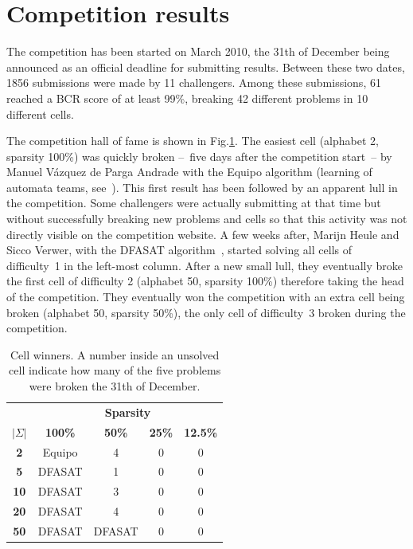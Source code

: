 
\section{Competition results\label{section:stamina-results}}

The competition has been started on March 2010, the 31th of December being announced as an official deadline for submitting results. Between these two dates, 1856 submissions were made by 11 challengers. Among these submissions, 61 reached a BCR score of at least 99\%, breaking 42 different problems in 10 different cells.

The competition hall of fame is shown in Fig.\ref{stamina:table:hall-of-fame}. The easiest cell (alphabet 2, sparsity 100\%) was quickly broken --~five days after the competition start~-- by Manuel V\'azquez de Parga Andrade with the Equipo algorithm (learning of automata teams, see~\cite{Garcia:2010}). This first result has been followed by an apparent lull in the competition. Some challengers were actually submitting at that time but without successfully breaking new problems and cells so that this activity was not directly visible on the competition website. A few weeks after, Marijn Heule and Sicco Verwer, with the DFASAT algorithm~\cite{Heule:2010}, started solving all cells of difficulty~1 in the left-most column. After a new small lull, they eventually broke the first cell of difficulty 2 (alphabet 50, sparsity 100\%) therefore taking the head of the competition. They eventually won the competition with an extra cell being broken (alphabet 50, sparsity 50\%), the only cell of difficulty~3 broken during the competition.

\begin{table}[H]
\begin{center}
\begin{tabular}{c|c c c c}
&\multicolumn{4}{|c}{\textbf{Sparsity}}\\ 
\textbf{$|\Sigma|$} & \textbf{100\%} & \textbf{50\%} & \textbf{25\%} & \textbf{12.5\%}\\
\hline
\textbf{2}  & Equipo & 4 & 0 & 0 \\
\textbf{5}  & DFASAT & 1 & 0 & 0 \\
\textbf{10} & DFASAT & 3 & 0 & 0 \\
\textbf{20} & DFASAT & 4 & 0 & 0 \\
\textbf{50} & DFASAT & DFASAT & 0 & 0 \\
\end{tabular}
\end{center}
\caption{Cell winners. A number inside an unsolved cell indicate how many of the five problems were broken the 31th of December.\label{stamina:table:hall-of-fame}}
\end{table}

